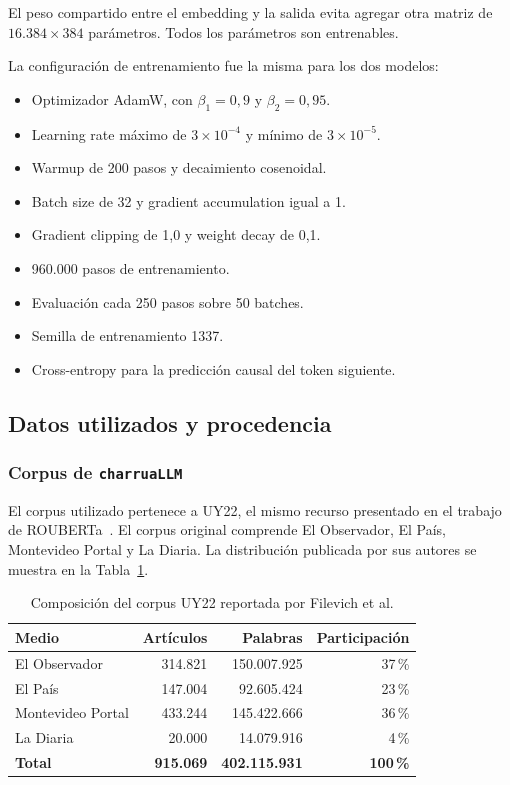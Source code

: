 \documentclass[11pt,a4paper]{article}
\newcommand{\charrua}{\texttt{charruaLLM}}
\begin{document}
El peso compartido entre el embedding y la salida evita agregar otra matriz de
$16.384 \times 384$ parámetros. Todos los parámetros son entrenables.

La configuración de entrenamiento fue la misma para los dos modelos:

\begin{itemize}
    \item Optimizador AdamW, con $\beta_1=0{,}9$ y $\beta_2=0{,}95$.
    \item Learning rate máximo de $3\times10^{-4}$ y mínimo de
          $3\times10^{-5}$.
    \item Warmup de 200 pasos y decaimiento cosenoidal.
    \item Batch size de 32 y gradient accumulation igual a 1.
    \item Gradient clipping de 1,0 y weight decay de 0,1.
    \item 960.000 pasos de entrenamiento.
    \item Evaluación cada 250 pasos sobre 50 batches.
    \item Semilla de entrenamiento 1337.
    \item Cross-entropy para la predicción causal del token siguiente.
\end{itemize}


\subsection{Datos utilizados y procedencia}

\subsubsection{Corpus de \charrua}

El corpus utilizado pertenece a UY22, el mismo recurso presentado en el trabajo
de ROUBERTa~\cite{filevich2024}. El corpus original comprende El Observador, El
País, Montevideo Portal y La Diaria. La distribución publicada por sus autores
se muestra en la Tabla~\ref{tab:uy22}.

\begin{table}[H]
    \centering
    \caption{Composición del corpus UY22 reportada por Filevich et al.}
    \label{tab:uy22}
    \begin{tabular}{lrrr}
        \toprule
        Medio & Artículos & Palabras & Participación \\
        \midrule
        El Observador & 314.821 & 150.007.925 & 37\,\% \\
        El País & 147.004 & 92.605.424 & 23\,\% \\
        Montevideo Portal & 433.244 & 145.422.666 & 36\,\% \\
        La Diaria & 20.000 & 14.079.916 & 4\,\% \\
        \midrule
        \textbf{Total} & \textbf{915.069} & \textbf{402.115.931} & \textbf{100\,\%} \\
        \bottomrule
    \end{tabular}
\end{table}
\end{document}
